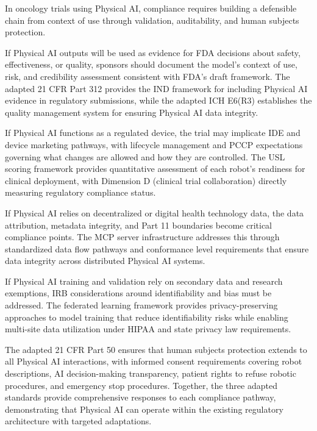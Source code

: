 In oncology trials using Physical AI, compliance requires building a defensible
chain from context of use through validation, auditability, and human subjects
protection.

If Physical AI outputs will be used as evidence for FDA decisions about safety,
effectiveness, or quality, sponsors should document the model's context of use,
risk, and credibility assessment consistent with FDA's draft framework. The
adapted 21 CFR Part 312 \cite{cfr312-adapt} provides the IND framework for
including Physical AI evidence in regulatory submissions, while the adapted ICH
E6(R3) \cite{ich-adapt} establishes the quality management system for ensuring
Physical AI data integrity.

If Physical AI functions as a regulated device, the trial may implicate IDE and
device marketing pathways, with lifecycle management and PCCP expectations
governing what changes are allowed and how they are controlled. The USL scoring
framework \cite{usl-standard} provides quantitative assessment of each robot's
readiness for clinical deployment, with Dimension D (clinical trial
collaboration) directly measuring regulatory compliance status.

If Physical AI relies on decentralized or digital health technology data, the
data attribution, metadata integrity, and Part 11 boundaries become critical
compliance points. The MCP server infrastructure \cite{national-mcp-paper}
addresses this through standardized data flow pathways and conformance level
requirements that ensure data integrity across distributed Physical AI systems.

If Physical AI training and validation rely on secondary data and research
exemptions, IRB considerations around identifiability and bias must be
addressed. The federated learning framework \cite{fl-paper} provides
privacy-preserving approaches to model training that reduce identifiability
risks while enabling multi-site data utilization under HIPAA \cite{hipaa} and
state privacy law requirements.

The adapted 21 CFR Part 50 \cite{cfr50-adapt} ensures that human subjects
protection extends to all Physical AI interactions, with informed consent
requirements covering robot descriptions, AI decision-making transparency,
patient rights to refuse robotic procedures, and emergency stop procedures.
Together, the three adapted standards provide comprehensive responses to each
compliance pathway, demonstrating that Physical AI can operate within the
existing regulatory architecture with targeted adaptations.

